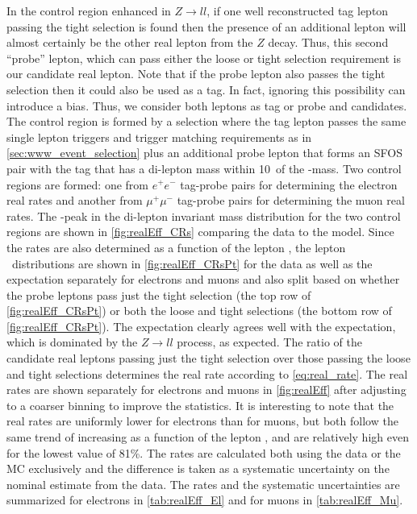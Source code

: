 In the control region enhanced
in $Z\rightarrow ll$, if one well reconstructed 
tag lepton passing the tight selection is found then the presence
of an additional lepton will almost certainly be the other real
lepton from the $Z$ decay. Thus, this second ``probe''
lepton, which can pass either the loose or tight selection
requirement is our candidate real lepton.
Note that if the probe lepton also passes the tight selection
then it could also be used as a tag. In fact, ignoring
this possibility can introduce a bias. Thus, we consider both 
leptons as tag or probe and candidates.
The control region is formed by a selection where 
the tag lepton passes the same single lepton triggers and trigger
matching requirements as in \sec\ref{sec:www_event_selection}
plus an additional probe lepton that forms an SFOS pair with the
tag that has a di-lepton mass within 10~\GeV of the \z-mass.
Two control regions are formed: one from $e^{+}e^{-}$ tag-probe
pairs for determining the electron real rates and another
from $\mu^{+}\mu^{-}$ tag-probe pairs for determining the muon
real rates. The \z-peak in the 
di-lepton invariant mass distribution for the two control regions
are shown in \fig\ref{fig:realEff_CRs} comparing the data
to the model.
Since the rates are also determined as a function of the lepton
\pt, the lepton \pt~distributions are shown in 
\fig\ref{fig:realEff_CRsPt}
for the data as well as the expectation separately for electrons
and muons and also split based on whether the probe leptons
pass just the tight selection 
(the top row of \fig\ref{fig:realEff_CRsPt})
or both the loose and tight selections
(the bottom row of \fig\ref{fig:realEff_CRsPt}).
The expectation clearly agrees well with the expectation, which is dominated
by the $Z\rightarrow ll$ process, as expected. The ratio of the 
candidate real leptons passing just the tight selection 
over those passing the loose and tight selections 
determines the real rate according to \eqn\eqref{eq:real_rate}.
The real rates are shown separately for electrons and muons 
in \fig\ref{fig:realEff} after adjusting to a coarser binning
to improve the statistics. 
It is interesting to note that the real rates
are uniformly lower for electrons than for muons, but both follow
the same trend of increasing as a function of the lepton \pt, 
and are relatively high even for the lowest value of 81\%.
The rates are calculated both using 
the data or the MC exclusively and the difference
is taken as a systematic uncertainty on the nominal estimate
from the data. 
The rates and the systematic uncertainties
are summarized for electrons
in \tab\ref{tab:realEff_El} and for muons in \tab\ref{tab:realEff_Mu}.




